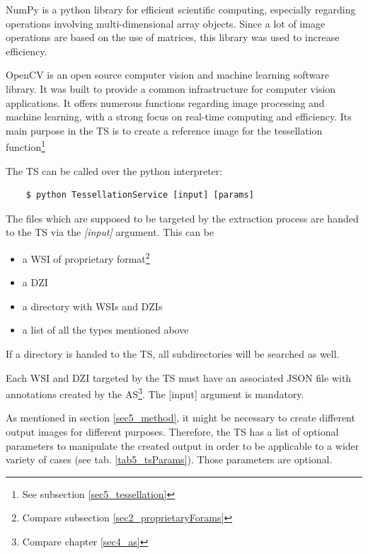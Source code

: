 NumPy is a python library for efficient scientific computing, especially regarding operations involving multi-dimensional array objects\cite{Walt11}. Since a lot of image operations are based on the use of matrices, this library was used to increase efficiency.

OpenCV  is an open source computer vision and machine learning software library. It was built to provide a common infrastructure for computer vision applications. It offers numerous functions regarding image processing and machine learning, with a strong focus on real-time computing and efficiency\cite{Bradski08}. Its main purpose in the TS is to create a reference image for the tessellation function\footnote{
	See subsection \ref{sec5_tessellation}
}

The TS can be called over the python interpreter:

\begin{lstlisting}
	$ python TessellationService [input] [params]
\end{lstlisting}

The files which are supposed to be targeted by the extraction process are handed to the TS via the \emph{[input]} argument. This can be
\begin{itemize}
	\item a WSI of proprietary format\footnote{
		Compare subsection \ref{sec2_proprietaryForams}
	}
	\item a DZI
	\item a directory with WSIs and DZIs
	\item a list of all the types mentioned above
\end{itemize}

If a directory is handed to the TS, all subdirectories will be searched as well.

Each WSI and DZI targeted by the TS must have an associated JSON file with annotations created by the AS\footnote{
	Compare chapter \ref{sec4_as}
}. The [input] argument is mandatory.

As mentioned in section \ref{sec5_method}, it might be necessary to create different output images for different purposes. Therefore, the TS has a list of optional parameters to manipulate the created output in order to be applicable to a wider variety of cases (see tab. \ref{tab5_tsParams}). Those parameters are optional. 

